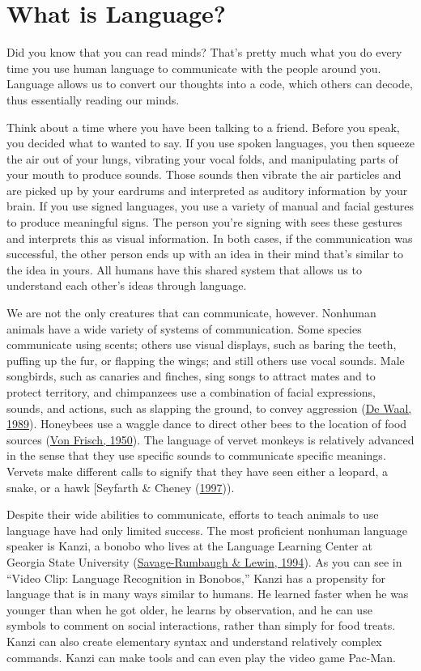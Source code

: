 \documentclass[
]{krantz}
\begin{document}
\hypertarget{what-is-language}{%
\section{What is Language?}\label{what-is-language}}

Did you know that you can read minds? That's pretty much what you do every time you use human language to communicate with the people around you. Language allows us to convert our thoughts into a code, which others can decode, thus essentially reading our minds.

Think about a time where you have been talking to a friend. Before you speak, you decided what to wanted to say. If you use spoken languages, you then squeeze the air out of your lungs, vibrating your vocal folds, and manipulating parts of your mouth to produce sounds. Those sounds then vibrate the air particles and are picked up by your eardrums and interpreted as auditory information by your brain. If you use signed languages, you use a variety of manual and facial gestures to produce meaningful signs. The person you're signing with sees these gestures and interprets this as visual information. In both cases, if the communication was successful, the other person ends up with an idea in their mind that's similar to the idea in yours. All humans have this shared system that allows us to understand each other's ideas through language.

We are not the only creatures that can communicate, however. Nonhuman animals have a wide variety of systems of communication. Some species communicate using scents; others use visual displays, such as baring the teeth, puffing up the fur, or flapping the wings; and still others use vocal sounds. Male songbirds, such as canaries and finches, sing songs to attract mates and to protect territory, and chimpanzees use a combination of facial expressions, sounds, and actions, such as slapping the ground, to convey aggression (\protect\hyperlink{ref-deWaal1989}{De Waal, 1989}). Honeybees use a waggle dance to direct other bees to the location of food sources (\protect\hyperlink{ref-vonFrisch1956}{Von Frisch, 1950}). The language of vervet monkeys is relatively advanced in the sense that they use specific sounds to communicate specific meanings. Vervets make different calls to signify that they have seen either a leopard, a snake, or a hawk {[}Seyfarth \& Cheney (\protect\hyperlink{ref-Seyfarth1997}{1997})).

Despite their wide abilities to communicate, efforts to teach animals to use language have had only limited success. The most proficient nonhuman language speaker is Kanzi, a bonobo who lives at the Language Learning Center at Georgia State University (\protect\hyperlink{ref-Savage-Rumbaugh1994}{Savage-Rumbaugh \& Lewin, 1994}). As you can see in ``Video Clip: Language Recognition in Bonobos,'' Kanzi has a propensity for language that is in many ways similar to humans. He learned faster when he was younger than when he got older, he learns by observation, and he can use symbols to comment on social interactions, rather than simply for food treats. Kanzi can also create elementary syntax and understand relatively complex commands. Kanzi can make tools and can even play the video game Pac-Man.
\end{document}
